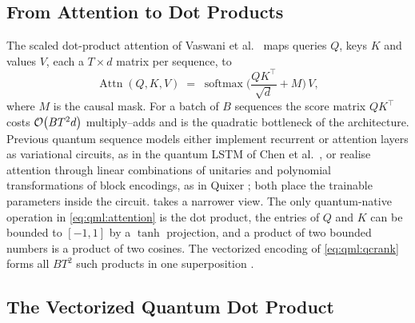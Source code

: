 \subsection{From Attention to Dot Products}\label{sec:qml:vqt:attention}

The scaled dot-product attention of Vaswani et al.~\cite{vaswani2017attention} maps queries $Q$, keys $K$ and values $V$, each a $T \times d$ matrix per sequence, to
\begin{equation}\label{eq:qml:attention}
\operatorname{Attn}(Q,K,V) \;=\; \operatorname{softmax}\!\Big(\frac{QK^{\top}}{\sqrt{d}} + M\Big)\,V,
\end{equation}
where $M$ is the causal mask. For a batch of $B$ sequences the score matrix $QK^\top$ costs $\mathcal{O}\!\left(BT^2 d\right)$ multiply--adds and is the quadratic bottleneck of the architecture. Previous quantum sequence models either implement recurrent or attention layers as variational circuits, as in the quantum LSTM of Chen et al.~\cite{chen2022qlstm}, or realise attention through linear combinations of unitaries and polynomial transformations of block encodings, as in Quixer \cite{khatri2024quixer}; both place the trainable parameters inside the circuit. \vqt{} takes a narrower view. The only quantum-native operation in \cref{eq:qml:attention} is the dot product, the entries of $Q$ and $K$ can be bounded to $[-1,1]$ by a $\tanh$ projection, and a product of two bounded numbers is a product of two cosines. The vectorized encoding of \cref{eq:qml:qcrank} forms all $BT^2$ such products in one superposition \cite{guo2025vqt}.

\subsection{The Vectorized Quantum Dot Product}\label{sec:qml:vqt:vqdp}

